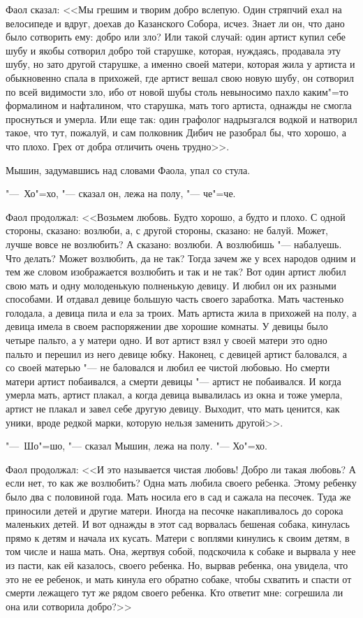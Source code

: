 Фаол сказал: <<Мы грешим и творим добро вслепую.
Один стряпчий ехал на велосипеде и вдруг, доехав до Казанского Собора, исчез.
Знает ли он, что дано было сотворить ему: добро или зло?
Или такой случай: один артист купил себе шубу и якобы сотворил добро той
старушке, которая, нуждаясь, продавала эту шубу, но зато другой старушке,
а именно своей матери, которая жила у артиста и обыкновенно спала в прихожей,
где артист вешал свою новую шубу, он сотворил по всей видимости зло, ибо от
новой шубы столь невыносимо пахло каким"=то формалином и нафталином, что
старушка, мать того артиста, однажды не смогла проснуться и умерла.
Или еще так: один графолог надрызгался водкой и натворил такое, что тут,
пожалуй, и сам полковник Дибич не разобрал бы, что хорошо, а что плохо.
Грех от добра отличить очень трудно>>.

Мышин, задумавшись над словами Фаола, упал со стула.

"---~Хо"=хо, "--- сказал он, лежа на полу, "--- че"=че.

Фаол продолжал: <<Возьмем любовь. Будто хорошо, а будто и плохо.
С одной стороны, сказано: возлюби, а, с другой стороны, сказано: не балуй.
Может, лучше вовсе не возлюбить? А сказано: возлюби. А возлюбишь "--- набалуешь.
Что делать? Может возлюбить, да не так? Тогда зачем же у всех народов одним
и тем же словом изображается возлюбить и так и не так?
Вот один артист любил свою мать и одну молоденькую полненькую девицу.
И любил он их разными способами. И отдавал девице большую часть своего заработка.
Мать частенько голодала, а девица пила и ела за троих.
Мать артиста жила в прихожей на полу, а девица имела в своем распоряжении
две хорошие комнаты. У девицы было четыре пальто, а у матери одно.
И вот артист взял у своей матери это одно пальто и перешил из него девице юбку.
Наконец, с девицей артист баловался, а со своей матерью "--- не баловался и
любил ее чистой любовью. Но смерти матери артист побаивался, а смерти
девицы "--- артист не побаивался. И когда умерла мать, артист плакал, а когда
девица вывалилась из окна и тоже умерла, артист не плакал и завел себе другую
девицу. Выходит, что мать ценится, как уники, вроде редкой марки, которую
нельзя заменить другой>>.

"---~Шо"=шо, "--- сказал Мышин, лежа на полу. "--- Хо"=хо.

Фаол продолжал:
<<И это называется чистая любовь! Добро ли такая любовь? А если нет, то
как же возлюбить? Одна мать любила своего ребенка.
Этому ребенку было два с половиной года. Мать носила его в сад и сажала на
песочек. Туда же приносили детей и другие матери. Иногда на песочке накапливалось
до сорока маленьких детей. И вот однажды в этот сад ворвалась бешеная собака,
кинулась прямо к детям и начала их кусать. Матери с воплями кинулись к своим
детям, в том числе и наша мать. Она, жертвуя собой, подскочила к собаке и
вырвала у нее из пасти, как ей казалось, своего ребенка. Но, вырвав ребенка,
она увидела, что это не ее ребенок, и мать кинула его обратно собаке, чтобы
схватить и спасти от смерти лежащего тут же рядом своего ребенка.
Кто ответит мне: согрешила ли она или сотворила добро?>>

